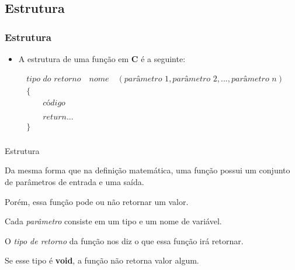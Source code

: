 \subsection{Estrutura}

\begin{frame}
    \frametitle{Estrutura}
    
        \begin{itemize}
            \item A estrutura de uma função em \textbf{C} é a seguinte:
        \end{itemize}
    
        \begin{equation*}
            \begin{aligned}
                & \textit{tipo do retorno} \quad \textit{nome} \quad ( \textit{parâmetro 1}, \textit{parâmetro 2}, ...,  \textit{parâmetro n} ) \\
                & \{ \\
                & \qquad \textit{código} \\
                & \\
                & \qquad return ...   \\
                & \} \\
            \end{aligned}
            \end{equation*}
        
\end{frame}



\begin{slide}{Estrutura}

    \item Da mesma forma que na definição matemática, uma função possui um conjunto de parâmetros de entrada e uma saída.

    \item Porém, essa função pode ou não retornar um valor.

    \item Cada \textit{parâmetro} consiste em um tipo e um nome de variável.

    \item O \textit{tipo de retorno} da função nos diz o que essa função irá retornar.

    \item Se esse tipo é \textbf{void}, a função não retorna valor algum.

\end{slide}
    



